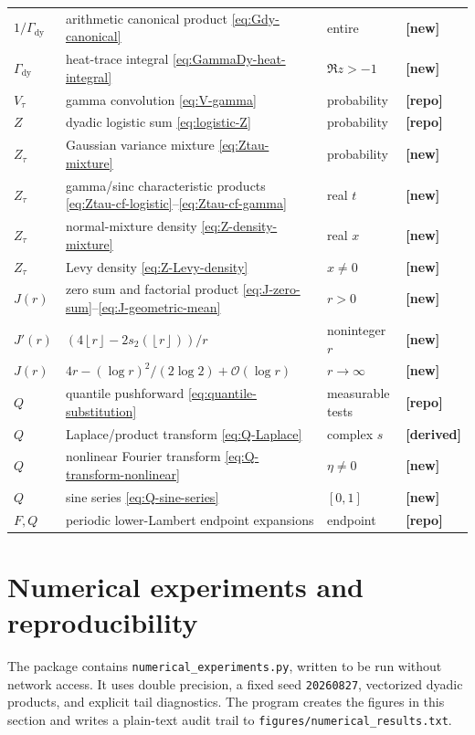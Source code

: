 \documentclass[11pt,oneside]{article}
\theoremstyle{definition}
\theoremstyle{remark}
\newcommand{\bigO}{\mathcal O}
\newcommand{\wt}{s_2}
\newcommand{\floor}[1]{\left\lfloor #1\right\rfloor}
\newcommand{\GammaDy}{\Gamma_{\!\mathrm{dy}}}
\newcommand{\RepoShort}{\textcolor{deepblue}{\textbf{[repo]}}}
\newcommand{\DerivedShort}{\textcolor{deepgreen}{\textbf{[derived]}}}
\newcommand{\NewShort}{\textcolor{amber}{\textbf{[new]}}}
\begin{document}
\begin{longtable}{@{}p{}p{}p{}p{}@{}}
$1/\GammaDy$ & arithmetic canonical product \eqref{eq:Gdy-canonical} & entire & \NewShort \\
$\GammaDy$ & heat-trace integral \eqref{eq:GammaDy-heat-integral} & $\Re z>-1$ & \NewShort \\
$V_\tau$ & gamma convolution \eqref{eq:V-gamma} & probability & \RepoShort \\
$Z$ & dyadic logistic sum \eqref{eq:logistic-Z} & probability & \RepoShort \\
$Z_\tau$ & Gaussian variance mixture \eqref{eq:Ztau-mixture} & probability & \NewShort \\
$Z_\tau$ & gamma/sinc characteristic products \eqref{eq:Ztau-cf-logistic}--\eqref{eq:Ztau-cf-gamma} & real $t$ & \NewShort \\
$Z_\tau$ & normal-mixture density \eqref{eq:Z-density-mixture} & real $x$ & \NewShort \\
$Z_\tau$ & Levy density \eqref{eq:Z-Levy-density} & $x\ne0$ & \NewShort \\
$J(r)$ & zero sum and factorial product \eqref{eq:J-zero-sum}--\eqref{eq:J-geometric-mean} & $r>0$ & \NewShort \\
$J'(r)$ & $(4\floor r-2\wt(\floor r))/r$ & noninteger $r$ & \NewShort \\
$J(r)$ & $4r-(\log r)^2/(2\log2)+\bigO(\log r)$ & $r\to\infty$ & \NewShort \\
$Q$ & quantile pushforward \eqref{eq:quantile-substitution} & measurable tests & \RepoShort \\
$Q$ & Laplace/product transform \eqref{eq:Q-Laplace} & complex $s$ & \DerivedShort \\
$Q$ & nonlinear Fourier transform \eqref{eq:Q-transform-nonlinear} & $\eta\ne0$ & \NewShort \\
$Q$ & sine series \eqref{eq:Q-sine-series} & $[0,1]$ & \NewShort \\
$F,Q$ & periodic lower-Lambert endpoint expansions & endpoint & \RepoShort \\
\bottomrule
\end{longtable}
\endgroup

\section{Numerical experiments and reproducibility}
\label{sec:numerics}

The package contains \texttt{numerical\_experiments.py}, written to be run without network
access.  It uses double precision, a fixed seed \texttt{20260827}, vectorized dyadic products,
and explicit tail diagnostics.  The program creates the figures in this section and writes a
plain-text audit trail to \texttt{figures/numerical\_results.txt}.
\end{document}
